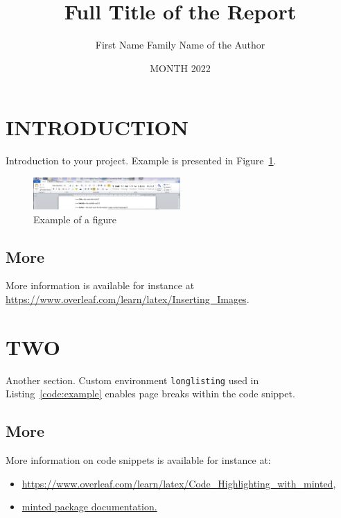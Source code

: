 \documentclass{reportOpenlab} %
\begin{document}
\title{Full Title of the Report}
\author{First Name Family Name of the Author}
\date{MONTH 2022}

\maketitlepage



\tableofcontents


\section{INTRODUCTION}
Introduction to your project. Example is presented in Figure~\ref{fig:example}.

\begin{figure}[h]
\centering
\includegraphics[width=0.5\textwidth]{assets/example.png}
\caption{Example of a figure~\cite{exampleCitation}}
\label{fig:example}
\end{figure}

\subsection{More}
More information is available for instance at \url{https://www.overleaf.com/learn/latex/Inserting_Images}.

\section{TWO}
Another section.
\ifprintCode
Custom environment \texttt{longlisting} used in Listing~\ref{code:example} enables page breaks within the code snippet.

\subsection{More}
More information on code snippets is available for instance at:
\begin{itemize}
    \item \url{https://www.overleaf.com/learn/latex/Code_Highlighting_with_minted},
    \item \href{https://repo.skni.umcs.pl/ctan/macros/latex/contrib/minted/minted.pdf}{minted package documentation.}
\end{itemize}
\end{document}
